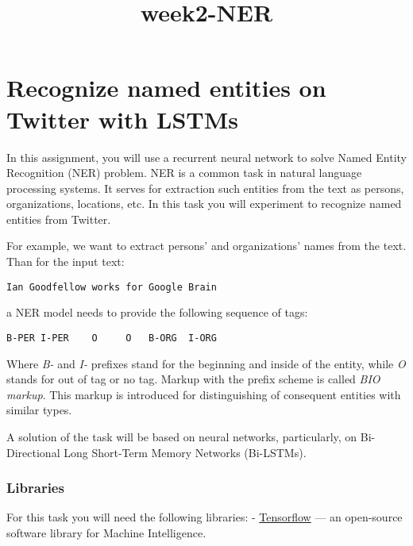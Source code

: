 \documentclass[11pt]{article}
\title{week2-NER}
\begin{document}
    
    \maketitle
    
    

    
    \hypertarget{recognize-named-entities-on-twitter-with-lstms}{%
\section{Recognize named entities on Twitter with
LSTMs}\label{recognize-named-entities-on-twitter-with-lstms}}

In this assignment, you will use a recurrent neural network to solve
Named Entity Recognition (NER) problem. NER is a common task in natural
language processing systems. It serves for extraction such entities from
the text as persons, organizations, locations, etc. In this task you
will experiment to recognize named entities from Twitter.

For example, we want to extract persons' and organizations' names from
the text. Than for the input text:

\begin{verbatim}
Ian Goodfellow works for Google Brain
\end{verbatim}

a NER model needs to provide the following sequence of tags:

\begin{verbatim}
B-PER I-PER    O     O   B-ORG  I-ORG
\end{verbatim}

Where \emph{B-} and \emph{I-} prefixes stand for the beginning and
inside of the entity, while \emph{O} stands for out of tag or no tag.
Markup with the prefix scheme is called \emph{BIO markup}. This markup
is introduced for distinguishing of consequent entities with similar
types.

A solution of the task will be based on neural networks, particularly,
on Bi-Directional Long Short-Term Memory Networks (Bi-LSTMs).

\hypertarget{libraries}{%
\subsubsection{Libraries}\label{libraries}}

For this task you will need the following libraries: -
\href{https://www.tensorflow.org}{Tensorflow} --- an open-source
software library for Machine Intelligence.
\end{document}
